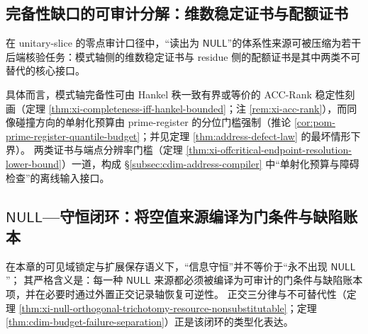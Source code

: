 \subsection{完备性缺口的可审计分解：维数稳定证书与配额证书}\label{subsec:cdim-completeness-gap-audit-decomposition}
在 unitary-slice 的零点审计口径中，“读出为 \(\mathsf{NULL}\)”的体系性来源可被压缩为若干后端核验任务：模式轴侧的维数稳定证书与 residue 侧的配额证书是其中两类不可替代的核心接口。
\par
具体而言，模式轴完备性可由 Hankel 秩一致有界或等价的 ACC-Rank 稳定性刻画（定理 \ref{thm:xi-completeness-iff-hankel-bounded}；注 \ref{rem:xi-acc-rank}），而同像碰撞方向的单射化预算由 prime-register 的分位门槛强制（推论 \ref{cor:pom-prime-register-quantile-budget}；并见定理 \ref{thm:address-defect-law} 的最坏情形下界）。
两类证书与端点分辨率门槛（定理 \ref{thm:xi-offcritical-endpoint-resolution-lower-bound}）一道，构成 \S\ref{subsec:cdim-address-compiler} 中“单射化预算与障碍检查”的离线输入接口。

\subsection{\texorpdfstring{$\mathsf{NULL}$}{NULL}—守恒闭环：将空值来源编译为门条件与缺陷账本}\label{subsec:cdim-null-conservation-loop}
在本章的可见域锁定与扩展保存语义下，“信息守恒”并不等价于“永不出现 \(\mathsf{NULL}\)”；
其严格含义是：每一种 \(\mathsf{NULL}\) 来源都必须被编译为可审计的门条件与缺陷账本项，并在必要时通过外置正交记录轴恢复可逆性。
正交三分律与不可替代性（定理 \ref{thm:xi-null-orthogonal-trichotomy-resource-nonsubstitutable}；定理 \ref{thm:cdim-budget-failure-separation}）正是该闭环的类型化表达。

\endinput
